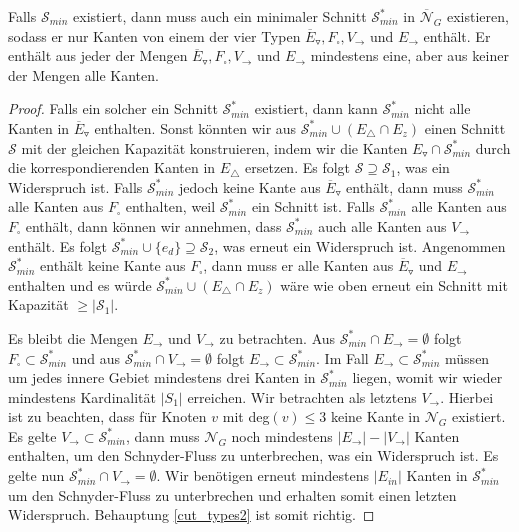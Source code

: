 \begin{claim}\label{cut_types2}
Falls $\mathcal{S}_{min}$ existiert, dann muss auch ein minimaler Schnitt $\mathcal{S}_{min}^*$ in $\overline{\mathcal{N}}_G$ existieren, sodass er nur Kanten von einem der vier Typen $\overline{E}_\triangledown, F_\square, V_\to$ und $E_\to$ enthält. Er enthält aus jeder der Mengen $\overline{E}_\triangledown, F_\square, V_\to$ und $E_\to$ mindestens eine, aber aus keiner der Mengen alle Kanten.
\end{claim}

\begin{proof}
Falls ein solcher ein Schnitt $\mathcal{S}_{min}^*$ existiert, dann kann $\mathcal{S}_{min}^*$ nicht alle Kanten in $\overline{E}_\triangledown$ enthalten. Sonst könnten wir aus $\mathcal{S}^*_{min} \cup (E_\triangle \cap E_z)$ einen Schnitt $\mathcal{S}$ mit der gleichen Kapazität konstruieren, indem wir die Kanten $E_\triangledown \cap \mathcal{S}^*_{min}$ durch die korrespondierenden Kanten in $E_\triangle$ ersetzen. Es folgt $\mathcal{S} \supseteq\mathcal{S}_1$, was ein Widerspruch ist. Falls $\mathcal{S}_{min}^*$ jedoch keine Kante aus $\overline{E}_\triangledown$ enthält, dann muss $\mathcal{S}_{min}^*$ alle Kanten aus $F_\square$ enthalten, weil $\mathcal{S}_{min}^*$ ein Schnitt ist. Falls $\mathcal{S}_{min}^*$ alle Kanten aus $F_\square$ enthält, dann können wir annehmen, dass $\mathcal{S}_{min}^*$ auch alle Kanten aus $V_\to$ enthält. Es folgt $\mathcal{S}^*_{min} \cup \{e_d\} \supseteq \mathcal{S}_2$, was erneut ein Widerspruch ist. Angenommen $\mathcal{S}_{min}^*$ enthält keine Kante aus $F_\square$, dann muss er alle Kanten aus $\overline{E}_\triangledown$ und $E_\to$ enthalten und es würde $\mathcal{S}^*_{min} \cup (E_\triangle \cap E_z)$ wäre wie oben erneut ein Schnitt mit Kapazität $\geq |\mathcal{S}_1|$. 

Es bleibt die Mengen $E_\to$ und $V_\to$ zu betrachten. Aus $\mathcal{S}_{min}^*\cap E_\to = \emptyset $ folgt $F_\square\subset\mathcal{S}_{min}^*$ und aus $\mathcal{S}_{min}^*\cap V_\to = \emptyset $ folgt $E_\to \subset  \mathcal{S}_{min}^*$. Im Fall $E_\to \subset  \mathcal{S}_{min}^*$ müssen um jedes innere Gebiet mindestens drei Kanten in $\mathcal{S}_{min}^*$ liegen, womit wir wieder mindestens Kardinalität $|S_1|$ erreichen. Wir betrachten als letztens $V_\to$. Hierbei ist zu beachten, dass für Knoten $v$ mit deg$(v) \leq 3$ keine Kante in $\mathcal{N}_G$ existiert. Es gelte $V_\to \subset  \mathcal{S}_{min}^*$, dann muss $\mathcal{N}_G$ noch mindestens $|E_\to|-|V_\to|$ Kanten enthalten, um den Schnyder-Fluss zu unterbrechen, was ein Widerspruch ist. Es gelte nun $\mathcal{S}_{min}^*\cap V_\to = \emptyset$. Wir benötigen erneut mindestens $|E_{in}|$ Kanten in $\mathcal{S}_{min}^*$ um den Schnyder-Fluss zu unterbrechen und erhalten somit einen letzten Widerspruch. Behauptung \ref{cut_types2} ist somit richtig.
\end{proof}

